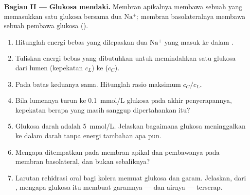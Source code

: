 \begin{problem}
\medskip
\noindent\textbf{Bagian II --- Glukosa mendaki.}
Membran apikalnya membawa sebuah  yang memasukkan satu glukosa
bersama dua $\mathrm{Na^+}$; membran basolateralnya membawa sebuah
pembawa glukosa ().
\begin{enumerate}[resume]
  \item Hitunglah energi bebas yang dilepaskan dua $\mathrm{Na^+}$ yang
        masuk ke dalam .
  \item Tuliskan energi bebas yang dibutuhkan untuk memindahkan satu
        glukosa dari lumen (kepekatan $c_L$) ke  ($c_C$).
  \item Pada batas  keduanya sama. Hitunglah rasio maksimum
        $c_C/c_L$.
  \item Bila lumennya turun ke \qty{0.1}{mmol/L} glukosa pada akhir
        penyerapannya, kepekatan  berapa yang masih sanggup
        dipertahankan  itu?
  \item Glukosa darah adalah \qty{5}{mmol/L}. Jelaskan bagaimana
        glukosa meninggalkan  ke dalam darah tanpa energi
        tambahan apa pun.
  \item Mengapa  ditempatkan pada membran apikal dan
        pembawanya pada membran basolateral, dan bukan sebaliknya?
  \item Larutan rehidrasi oral bagi kolera memuat glukosa dan garam.
        Jelaskan, dari , mengapa glukosa itu membuat garamnya
        --- dan airnya --- terserap.
\end{enumerate}


\end{problem}
